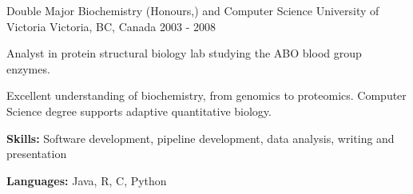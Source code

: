 \begin{cventries}
\cventry
{Double Major Biochemistry (Honours,) and Computer Science} %
{University of Victoria} %
{Victoria, BC, Canada} %
{2003 - 2008} %
{
\begin{cvitems}
 \item {Analyst in protein structural biology lab studying the ABO blood group enzymes.}
 \item {Excellent understanding of biochemistry, from  genomics to proteomics. Computer Science degree supports adaptive quantitative biology.}
 \item {\textbf{Skills:}  Software development, pipeline development, data analysis, writing and presentation}
 \item {\textbf{Languages:} Java, R, C, Python}
\end{cvitems}
}
\end{cventries}
